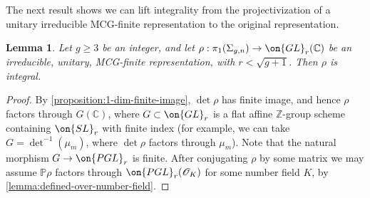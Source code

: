 \documentclass[12 pt]{amsart}
\theoremstyle{plain}
\newtheorem{lemma}[subsubsection]{Lemma}
\theoremstyle{definition}
\theoremstyle{remark}
\numberwithin{equation}{section}
\begin{document}
The next result shows we can lift integrality from the projectivization of a unitary irreducible MCG-finite representation to the original representation. 

\begin{lemma}
	\label{lemma:gl-defined-over-number-field}
	Let $g\geq 3$ be an integer, and let $\rho: \pi_1(\Sigma_{g,n})\to \on{GL}_r(\mathbb{C})$ be an irreducible, unitary, MCG-finite representation, with $r<\sqrt{g+1}$. Then $\rho$ is integral.
	\end{lemma}
\begin{proof}
By \autoref{proposition:1-dim-finite-image}, $\det\rho$ has finite image, and
hence $\rho$ factors through $G(\mathbb{C})$, where $G\subset \on{GL}_r$ is a
flat affine $\mathbb{Z}$-group scheme containing $\on{SL}_r$ with finite index (for
example, we can take $G=\det^{-1}(\mu_m)$, where $\det\rho$ factors through
$\mu_m$). Note that the natural morphism $G\to \on{PGL}_r$ is finite. After
conjugating $\rho$ by some matrix we may assume $\mathbb{P}\rho$ factors through
$\on{PGL}_r(\mathscr{O}_K)$ for some number field $K$, by \autoref{lemma:defined-over-number-field}.


\end{proof}
\end{document}

